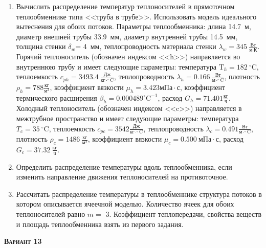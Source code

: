 \begin{enumerate} 
\item Вычислить распределение температур теплоносителей в прямоточном теплообменнике типа <<труба в трубе>>. Использовать модель идеального вытеснения для обоих потоков. Параметры теплообменника: длина  14.7~м, диаметр внешней трубы 33.9~мм,  диаметр внутренней трубы 14.5~мм, толщина стенки $\delta_{w}$=     4~мм,  теплопроводность материала стенки $\lambda_{w}=  345~\frac{\text{Вт}}{\text{м} \cdot \text{К}}$.  Горячий теплоноситель (обозначен индексом <<h>>) направляется во внутреннюю трубу и	 имеет следующие параметры: температура $\text{T}_{h}= 182~^\circ\mathrm{C}$, теплоемкость	  $c_{p{h}}= 3493.4~\frac{\text{Дж}}{\text{кг} \cdot ^\circ\mathrm{C}}$, теплопроводность 		$\lambda_{h}= 0.166~\frac{\text{Вт}}{\text{м} \cdot ^\circ\mathrm{C}}$, плотность 		$\rho_{h}=  788 \frac{\text{кг}}{\text{м}^3}$, коэффициент вязкости $\mu_{h}=3.423 \text{мПа} 		\cdot \text{с} $, коэффициент термического расширения $\beta_{h}=0.000489 ^\circ\mathrm{C}^{-1}$,		 расход $G_{h}= 71.401 \frac{\text{кг}}{\text{ч}}$. Холодный теплоноситель (обозначен индексом <<c>>) 		 направляется в межтрубное пространство и имеет следующие параметры: температура $T_{c}=   35		 ~^\circ\mathrm{C}$, теплоемкость $c_{p{c}}= 3542 \frac{\text{Дж}}{\text{кг} \cdot ^\circ\mathrm{C}}$,			 теплопроводность $\lambda_{c}=0.491 \frac{\text{Вт}}{\text{м} \cdot ^\circ\mathrm{C}}$, плотность 			 $\rho_{c}=  1486~\frac{\text{кг}}{\text{м}^3}$, коэффициент вязкости $\mu_{c}=0.500~\text{мПа} \cdot \text{с} $, 			 расход $G_{c}=37.32~\frac{\text{кг}}{\text{ч}}$. 

\item Определить распределение температуры вдоль теплообменника, если 	изменить направление движения теплоносителей на противоточное.

\item Рассчитать распределение температуры в теплообменнике структура потоков в котором описывается ячеечной моделью. Количество ячеек для обоих теплоносителей равно $m = $ 3. Коэффициент теплопередачи, свойства веществ и площадь теплообменника взять из первого задания.

\end{enumerate}

\textsc{\textbf{Вариант 13}}

